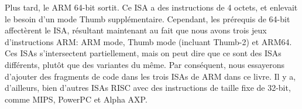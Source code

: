 Plus tard, le ARM 64-bit sortit. Ce \ac{ISA} a des instructions de 4 octets, et enlevait le besoin d'un mode Thumb supplémentaire.
Cependant, les prérequis de 64-bit affectèrent le \ac{ISA}, résultant maintenant au fait que nous avons trois jeux d'instructions ARM: ARM mode, Thumb mode (incluant Thumb-2) et ARM64.
Ces \ac{ISA}s s'intersectent partiellement, mais on peut dire que ce sont des \ac{ISA}s différents, plutôt que des variantes du même.
Par conséquent, nous essayerons d'ajouter des fragments de code dans les trois \ac{ISA}s de ARM dans ce livre.
%
%
%
Il y a, d'ailleurs, bien d'autres \ac{ISA}s \ac{RISC} avec des instructions de taille fixe de 32-bit, comme MIPS, PowerPC et Alpha AXP.

